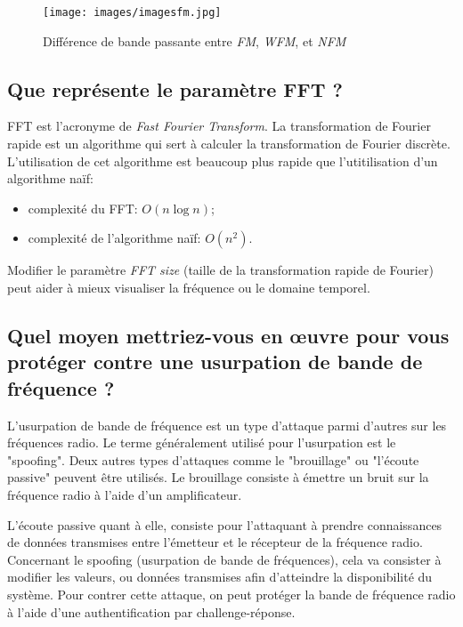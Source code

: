 \documentclass[a4paper]{article}
\begin{document}
\begin{figure}[H]
    \centering
    \texttt{[image: images/imagesfm.jpg]}
    \caption{Différence de bande passante entre \emph{FM}, \emph{WFM}, et \emph{NFM}}
\end{figure}










\subsection{Que représente le paramètre FFT ?}





FFT est l'acronyme de \textit{Fast Fourier Transform}. La transformation de Fourier rapide est un algorithme qui sert à calculer la transformation de Fourier discrète. L'utilisation de cet algorithme est beaucoup plus rapide que l'utitilisation d'un algorithme naïf:
\begin{itemize}
    \item complexité du FFT: $ O(n \log n) $;
    \item complexité de l'algorithme naïf: $ O(n^2) $.
\end{itemize}
Modifier le paramètre \textit{FFT size} (taille de la transformation rapide de Fourier) peut aider à mieux visualiser la fréquence ou le domaine temporel.










\subsection{Quel moyen mettriez-vous en œuvre pour vous protéger contre une usurpation de bande de fréquence ?}





L’usurpation de bande de fréquence est un type d’attaque parmi d’autres sur les fréquences radio. Le terme généralement utilisé pour l’usurpation est le "spoofing". Deux autres types d’attaques comme le "brouillage" ou "l’écoute passive" peuvent être utilisés. Le brouillage consiste à émettre un bruit sur la fréquence radio à l’aide d’un amplificateur.

L’écoute passive quant à elle, consiste pour l’attaquant à prendre connaissances de données transmises entre l’émetteur et le récepteur de la fréquence radio. Concernant le spoofing (usurpation de bande de fréquences), cela va consister à modifier les valeurs, ou données transmises afin d’atteindre la disponibilité du système. Pour contrer cette attaque, on peut protéger la bande de fréquence radio à l’aide d’une authentification par challenge-réponse.
\end{document}
